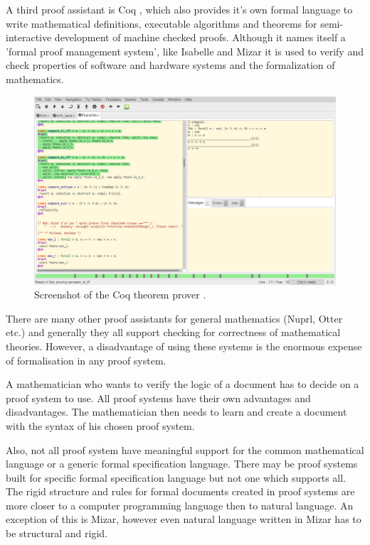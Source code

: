 A third proof assistant is Coq \cite{coq}, which also provides it's own formal
language to write mathematical definitions, executable algorithms and theorems
for semi-interactive development of machine checked proofs. Although it names
itself a 'formal proof management system', like Isabelle and Mizar it is used to
verify and check properties of software and hardware systems and the
formalization of mathematics.

\begin{figure}[H]
\begin{center}
\includegraphics[scale=0.4]{Figures/Background/coq.png}
\end{center}
\caption{Screenshot of the Coq theorem prover \cite{coq}. \label{fig:coq}}
\end{figure}

There are many other proof assistants for general mathematics (Nuprl, Otter
etc.) and generally they all support checking for correctness of mathematical
theories. However, a disadvantage of using these systems is the enormous expense
of formalisation in any proof system. 

A mathematician who wants to verify the logic of a document has to decide on a
proof system to use. All proof systems have their own advantages and
disadvantages. The mathematician then needs to learn and create a
document with the syntax of his chosen proof system.

Also, not all proof system have meaningful support for the common mathematical
language or a generic formal specification language. There may be proof systems
built for specific formal specification language but not one which supports all.
The rigid structure and rules for formal documents created in proof systems are
more closer to a computer programming language then to natural language. An
exception of this is Mizar, however even natural language written in Mizar has
to be structural and rigid.

